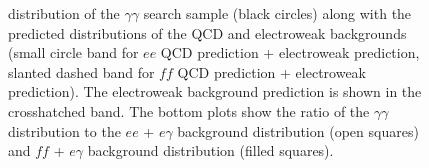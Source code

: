 \documentclass[dissertation_bw.tex]{subfiles}
\begin{document}
\begin{figure}
	\caption{\MET distribution of the $\gamma\gamma$ search sample (black circles) along with the predicted \MET distributions of the QCD and electroweak backgrounds (small circle band for $ee$ QCD prediction + electroweak prediction, slanted dashed band for $\mathit{ff}$ QCD prediction + electroweak prediction).  The electroweak background prediction is shown in the crosshatched band.  The bottom plots show the ratio of the $\gamma\gamma$ \MET distribution to the $ee$ + $e\gamma$ background distribution (open squares) and $\mathit{ff}$ + $e\gamma$ background distribution (filled squares).}
	\label{fig:MET_final}
\end{figure}
\end{document}
